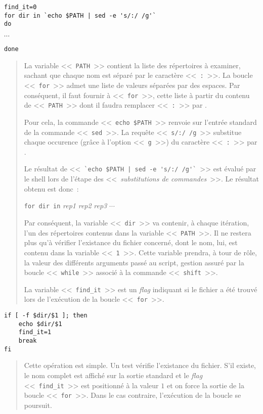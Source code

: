 \begin{verbatim}
find_it=0
for dir in `echo $PATH | sed -e 's/:/ /g'`
do
\end{verbatim}
\vspace{2ex}
$\cdots$
\\[2ex]
\begin{verbatim}
done
\end{verbatim}
\begin{quote}
La variable <<~{\tt PATH}~>> contient la liste des r{\'e}pertoires {\`a} examiner, sachant que
chaque nom est s{\'e}par{\'e} par le caract{\`e}re <<~{\tt :}~>>. La boucle <<~{\tt for}~>>
admet une liste de valeurs s{\'e}par{\'e}es par des espaces. Par cons{\'e}quent, il faut fournir
{\`a} <<~{\tt for}~>>, cette liste {\`a} partir du contenu de <<~{\tt PATH}~>> dont il faudra
remplacer <<~{\tt :}~>> par \spacekey.

Pour cela, la commande <<~\verb,echo $PATH,~>> renvoie sur l'entr{\'e}e standard de la
commande <<~{\tt sed}~>>. La requ{\^e}te <<~\verb*,s/:/ /g,~>> substitue chaque
occurence (gr{\^a}ce {\`a} l'option <<~{\tt g}~>>) du caract{\`e}re <<~{\tt :}~>> par
\spacekey.

Le r{\'e}sultat de <<~\verb*,`echo $PATH | sed -e 's/:/ /g'`,~>> est {\'e}valu{\'e} par le
shell lors de l'{\'e}tape des <<~{\sl substitutions de commandes}~>>. Le r{\'e}sultat obtenu
est donc~:
\begin{center}
\verb,for dir in, {\sl rep1} {\sl rep2} {\sl rep3} $\cdots$
\end{center}
Par cons{\'e}quent, la variable <<~{\tt dir}~>> va contenir, {\`a} chaque it{\'e}ration, l'un
des r{\'e}pertoires contenus dans la variable <<~{\tt PATH}~>>. Il ne restera plus qu'{\`a}
v{\'e}rifier l'existance du fichier concern{\'e}, dont le nom, lui, est contenu dans la variable
<<~{\tt 1}~>>. Cette variable prendra, {\`a} tour de r{\^o}le, la valeur des diff{\'e}rents
arguments pass{\'e} au script, gestion assur{\'e} par la boucle <<~{\tt while}~>> associ{\'e}
{\`a} la commande <<~{\tt shift}~>>.

La variable <<~{\tt find\_it}~>> est un {\it flag} indiquant si le fichier a {\'e}t{\'e} trouv{\'e}
lors de l'ex{\'e}cution de la boucle <<~{\tt for}~>>.
\end{quote}

\begin{verbatim}
if [ -f $dir/$1 ]; then
    echo $dir/$1
    find_it=1
    break
fi
\end{verbatim}
\begin{quote}
Cette op{\'e}ration est simple. Un test v{\'e}rifie l'existance du fichier. S'il existe, le nom complet
est affich{\'e} sur la sortie standard et le {\it flag} <<~{\tt find\_it}~>>
est positionn{\'e} {\`a} la valeur $1$ et on force la sortie de la boucle <<~{\tt for}~>>. Dans le
cas contraire, l'ex{\'e}cution de la boucle se poursuit.
\end{quote}

